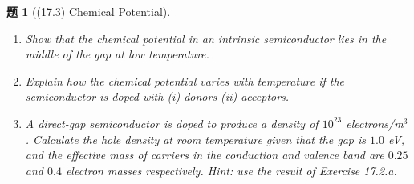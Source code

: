 \documentclass[UTF8,10pt,a4paper]{article}
\theoremstyle{Problem}
\newtheorem{prob}{题}
\theoremstyle{Solution}
\begin{document}
\begin{prob}[(17.3) Chemical Potential]
    \begin{enumerate}
        \item[(a)] Show that the chemical potential in an intrinsic semiconductor lies in the middle of the gap at low temperature.
        \item[(b)] Explain how the chemical potential varies with temperature if the semiconductor is doped with (i) donors (ii) acceptors.
        \item[(c)] A direct-gap semiconductor is doped to produce a density of $10^{23}$ electrons/m$^3$. Calculate the hole density at room temperature given that the gap is $1.0$ eV, and the effective mass of carriers in the conduction and valence band are $0.25$ and $0.4$ electron masses respectively. Hint: use the result of Exercise 17.2.a.
    \end{enumerate}
\end{prob}
\end{document}
